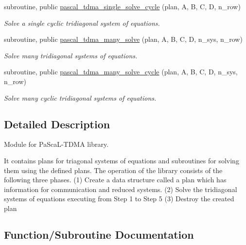 \begin{DoxyCompactItemize}
subroutine, public \mbox{\hyperlink{namespacepascal__tdma_ac8e377fa86c75126380f0196f6046043}{pascal\+\_\+tdma\+\_\+single\+\_\+solve\+\_\+cycle}} (plan, A, B, C, D, n\+\_\+row)
\begin{DoxyCompactList}\small\item\em Solve a single cyclic tridiagonal system of equations. \end{DoxyCompactList}\item 
subroutine, public \mbox{\hyperlink{namespacepascal__tdma_afa0c78b8377f5fe1059907befda3c940}{pascal\+\_\+tdma\+\_\+many\+\_\+solve}} (plan, A, B, C, D, n\+\_\+sys, n\+\_\+row)
\begin{DoxyCompactList}\small\item\em Solve many tridiagonal systems of equations. \end{DoxyCompactList}\item 
subroutine, public \mbox{\hyperlink{namespacepascal__tdma_acbaed65e67ecbfd92a8f1d51d1b69fd5}{pascal\+\_\+tdma\+\_\+many\+\_\+solve\+\_\+cycle}} (plan, A, B, C, D, n\+\_\+sys, n\+\_\+row)
\begin{DoxyCompactList}\small\item\em Solve many cyclic tridiagonal systems of equations. \end{DoxyCompactList}\end{DoxyCompactItemize}


\subsection{Detailed Description}
Module for Pa\+Sca\+L-\/\+T\+D\+MA library. 

It contains plans for triagonal systems of equations and subroutines for solving them using the defined plans. The operation of the library consists of the following three phases. (1) Create a data structure called a plan which has information for communication and reduced systems. (2) Solve the tridiagonal systems of equations executing from Step 1 to Step 5 (3) Destroy the created plan 

\subsection{Function/\+Subroutine Documentation}
\mbox{\label{namespacepascal__tdma_afa0c78b8377f5fe1059907befda3c940}} 
